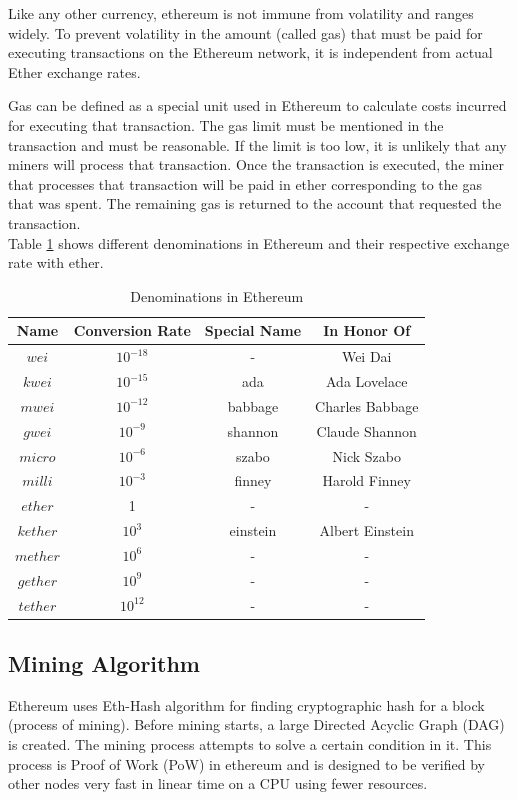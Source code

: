 \documentclass[11pt,openright]{report}
\begin{document}
Like any other currency, ethereum is not immune from volatility and ranges widely. To prevent volatility in the amount (called gas) that must be paid for executing transactions on the Ethereum network, it is independent from actual Ether exchange rates. 

Gas can be defined as a special unit used in Ethereum to calculate costs incurred for executing that transaction. The gas limit must be mentioned in the transaction and must be reasonable. If the limit is too low, it is unlikely that any miners will process that transaction. Once the transaction is executed, the miner that processes that transaction will be paid in ether corresponding to the gas that was spent. The remaining gas is returned to the account that requested the transaction.
\newpage
\hfill\\
Table \ref{eth_denominations} shows different denominations in Ethereum and their respective exchange rate with ether.
\begin{table}[!htbp]
	\renewcommand{\arraystretch}{1.3}
	\caption{Denominations in Ethereum}
	\label{eth_denominations}
	\centering
	\begin{tabular}{|c||c|c|c|}
		\hline
		\bfseries Name & \bfseries Conversion Rate & \bfseries Special Name & \bfseries In Honor Of\\
		\hline\hline
		$wei$ & $10^{-18}$ & - & Wei Dai \\ \hline
	    $kwei$ & $10^{-15}$ & ada & Ada Lovelace \\ \hline
	    $mwei$ & $10^{-12}$ & babbage & Charles Babbage \\ \hline
	    $gwei$ & $10^{-9}$ & shannon & Claude Shannon \\ \hline
	    $micro$ & $10^{-6}$ & szabo & Nick Szabo \\ \hline
	    $milli$ & $10^{-3}$ & finney & Harold Finney \\ \hline
	    $ether$ & 1 & - & - \\ \hline
	    $kether$ & $10^{3}$ & einstein & Albert Einstein \\ \hline
	    $mether$ & $10^{6}$ & - & - \\ \hline
	    $gether$ & $10^{9}$ & - & - \\ \hline
	    $tether$ & $10^{12}$ & - & - \\ \hline
	\end{tabular}
\end{table}
\newline
\newline
\subsection{Mining Algorithm}
Ethereum uses Eth-Hash algorithm \cite{wood2014yellow} for finding cryptographic hash for a block (process of mining). Before mining starts, a large Directed Acyclic Graph (DAG) is created. The mining process attempts to solve a certain condition in it. This process is Proof of Work (PoW) in ethereum and is designed to be verified by other nodes very fast in linear time on a CPU using fewer resources.
\end{document}
